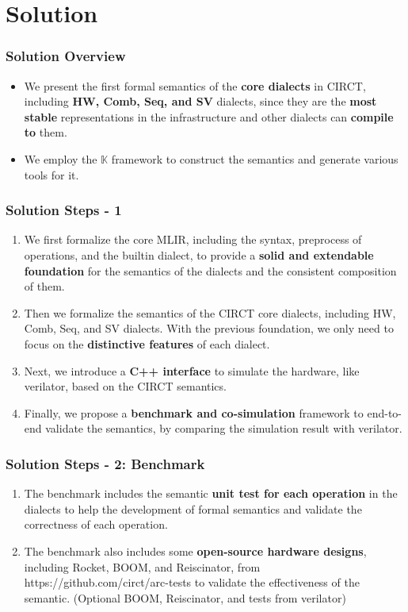 \documentclass{beamer}
\begin{document}
\section{Solution}
\begin{frame}
    \frametitle{Solution Overview}
    \begin{itemize}
        \item We present the first formal semantics of the \textbf{core dialects} in CIRCT, including \textbf{HW, Comb, Seq, and SV} dialects, since they are the \textbf{most stable} representations in the infrastructure and other dialects can \textbf{compile to} them. 
        \item We employ the $\mathbb{K}$ framework to construct the semantics and generate various tools for it.
    \end{itemize}
\end{frame}

\begin{frame}
    \frametitle{Solution Steps - 1}
    \begin{enumerate}
        \item We first formalize the core MLIR, including the syntax, preprocess of operations, and the builtin dialect, to provide a \textbf{solid and extendable foundation} for the semantics of the dialects and the consistent composition of them.
        \item Then we formalize the semantics of the CIRCT core dialects, including HW, Comb, Seq, and SV dialects. With the previous foundation, we only need to focus on the \textbf{distinctive features} of each dialect.
        \item Next, we introduce a \textbf{C++ interface} to simulate the hardware, like verilator, based on the CIRCT semantics.
        \item Finally, we propose a \textbf{benchmark and co-simulation} framework to end-to-end validate the semantics, by comparing the simulation result with verilator. 
    \end{enumerate}
\end{frame}

\begin{frame}
    \frametitle{Solution Steps - 2: Benchmark}
    \begin{enumerate}
        \item The benchmark includes the semantic \textbf{unit test for each operation} in the dialects to help the development of formal semantics and validate the correctness of each operation. 
        \item The benchmark also includes some \textbf{open-source hardware designs}, including Rocket, BOOM, and Reiscinator, from https://github.com/circt/arc-tests to validate the effectiveness of the semantic. (Optional BOOM, Reiscinator, and tests from verilator)
    \end{enumerate}
\end{frame}
\end{document}
